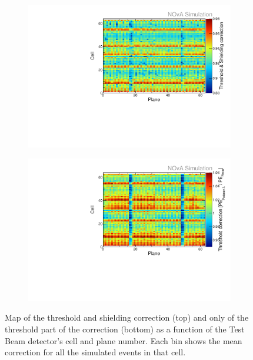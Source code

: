 \begin{figure}[!hbtp]
\centering
\begin{subfigure}[t]{\textwidth}
\centering
\includegraphics[width=.8\textwidth]{Plots/TBCalibration/ThresholdCorrectionMap_P4DataBasedSim.pdf}
\end{subfigure}
\begin{subfigure}[b]{\textwidth}
\centering
\includegraphics[width=.8\textwidth]{Plots/TBCalibration/ThresholdOnlyCorrectionMap_P4DataBasedSim.pdf}
\end{subfigure}
\caption[Map of the threshold and shielding correction across the Test Beam detector]{Map of the threshold and shielding correction (top) and only of the threshold part of the correction (bottom) as a function of the Test Beam detector's cell and plane number. Each bin shows the mean correction for all the simulated events in that cell.}
\label{fig:TBThresholdCorrectionMap}
\end{figure}

